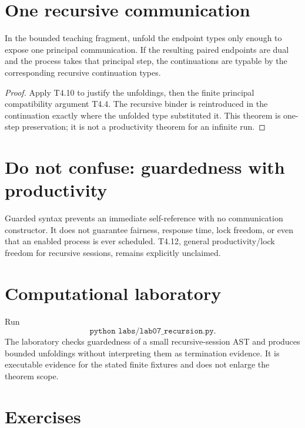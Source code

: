 \section{One recursive communication}
\begin{theorem}
In the bounded teaching fragment, unfold the endpoint types only enough to expose one principal communication. If the resulting paired endpoints are dual and the process takes that principal step, the continuations are typable by the corresponding recursive continuation types.
\end{theorem}
\begin{proof}
Apply T4.10 to justify the unfoldings, then the finite principal compatibility argument T4.4. The recursive binder is reintroduced in the continuation exactly where the unfolded type substituted it. This theorem is one-step preservation; it is not a productivity theorem for an infinite run.
\end{proof}

\section{Do not confuse: guardedness with productivity}
\begin{warningbox}
Guarded syntax prevents an immediate self-reference with no communication constructor. It does not guarantee fairness, response time, lock freedom, or even that an enabled process is ever scheduled. T4.12, general productivity/lock freedom for recursive sessions, remains explicitly unclaimed.
\end{warningbox}



\section{Computational laboratory}
\begin{labbox}
Run
\[
  \texttt{python labs/lab07_recursion.py}.
\]
The laboratory checks guardedness of a small recursive-session AST and produces bounded unfoldings without interpreting them as termination evidence. It is executable evidence for the stated finite fixtures and does not enlarge the theorem scope.
\end{labbox}

\section{Exercises}
